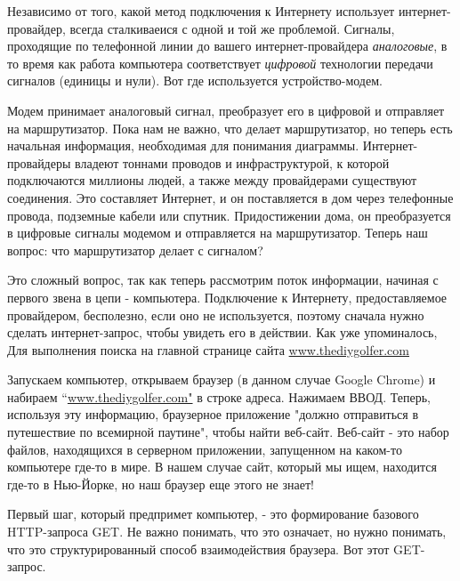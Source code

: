 \documentclass{article}
\begin{document}
Независимо от того, какой метод подключения к Интернету использует
интернет-провайдер, всегда сталкиваеися с одной и той же проблемой.
Сигналы, проходящие по телефонной линии до вашего интернет-провайдера
\emph{аналоговые}, в то время как работа компьютера соответствует
\emph{цифровой} технологии передачи сигналов (единицы и нули). Вот где
используется устройство-модем.

Модем принимает аналоговый сигнал, преобразует его в цифровой и
отправляет на маршрутизатор. Пока нам не важно, что делает
маршрутизатор, но теперь есть начальная информация, необходимая для
понимания диаграммы. Интернет-провайдеры владеют тоннами проводов и
инфраструктурой, к которой подключаются миллионы людей, а также между
провайдерами существуют соединения. Это составляет Интернет, и он
поставляется в дом через телефонные провода, подземные кабели или
спутник. Придостижении дома, он преобразуется в цифровые сигналы модемом
и отправляется на маршрутизатор. Теперь наш вопрос: что маршрутизатор
делает с сигналом?

Это сложный вопрос, так как теперь рассмотрим поток информации, начиная
с первого звена в цепи - компьютера. Подключение к Интернету,
предоставляемое провайдером, бесполезно, если оно не используется,
поэтому сначала нужно сделать интернет-запрос, чтобы увидеть его в
действии. Как уже упоминалось, Для выполнения поиска на главной странице
сайта \href{http://www.thediygolfer.com}{www.thediygolfer.com}

Запускаем компьютер, открываем браузер (в данном случае Google Chrome) и
набираем ``\href{http://www.thediygolfer.com}{www.thediygolfer.com"} в
строке адреса. Нажимаем ВВОД. Теперь, используя эту информацию,
браузерное приложение "должно отправиться в путешествие по всемирной
паутине", чтобы найти веб-сайт. Веб-сайт - это набор файлов, находящихся
в серверном приложении, запущенном на каком-то компьютере где-то в мире.
В нашем случае сайт, который мы ищем, находится где-то в Нью-Йорке, но
наш браузер еще этого не знает!

Первый шаг, который предпримет компьютер, - это формирование базового
HTTP-запроса GET. Не важно понимать, что это означает, но нужно
понимать, что это структурированный способ взаимодействия браузера. Вот
этот GET-запрос.
\end{document}

